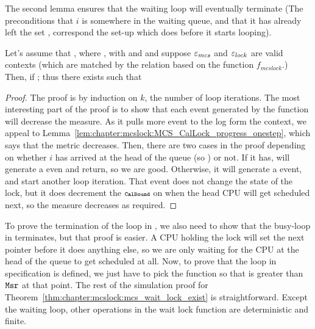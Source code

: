 The second lemma ensures that the waiting loop will eventually
terminate (The preconditions that $i$ is somewhere in the waiting queue,
and that it has already left the set , correspond the set-up
which  does before it starts looping).

\begin{lemma}
\label{lem:chapter:mcslock:CalWaitGet_exist'}
Let's assume that , where
, with  and  and suppose ${\varepsilon}_{mcs}$ and ${\varepsilon}_{lock}$  are valid
contexts (which are matched by the relation based on the function $f_{mcslock}$.) Then, if ; thus there exists  such
that 
\end{lemma}


\begin{proof}
The proof is by induction on $k$, the number of loop iterations. The
most interesting part of the proof is to show that each event
generated by the function will decrease the measure.
As it pulls more event to the log form the context, we appeal to
Lemma~\ref{lem:chapter:mcslock:MCS_CalLock_progress_onestep}, which says that the metric decreases. 
Then, there are two cases in the proof depending on whether $i$ has
arrived at the head of the queue (so ) or not. If it has,
 will generate a 
even and return, so we are good. 
Otherwise, it will generate a  event, and
start another loop iteration. That event does not change the state of
the lock, but it does decrement the $\CalBound$ on when the head CPU
will get scheduled next, so the measure decreases as required.
\end{proof}

To prove the termination of the loop in , 
we also need to show that the busy-loop in  terminates, 
but that proof is easier. A CPU holding the lock will set
the next pointer before it does anything else, so we are only waiting
for the CPU at the head of the queue to get scheduled at all.
Now, to prove that the loop in  specification
is defined, we just have to pick the function 
so that  is greater than ${\mathrm{\texttt{Msr}}}$ at that
point. The rest of the simulation proof for Theorem~\ref{thm:chapter:mcslock:mcs_wait_lock_exist} is straightforward.
Except the waiting loop, other operations in the wait lock function are deterministic and finite. 



